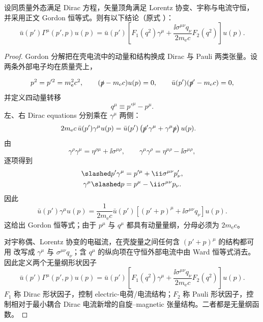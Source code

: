 \begin{proposition}[在壳矢量顶角的独立张量基]
设同质量外态满足 Dirac 方程，矢量顶角满足 Lorentz 协变、宇称与电流守恒，并采用正文 Gordon 恒等式。则有以下结论（原式 ）：
\begin{equation*}
 \boxed{
 \bar u(p')\Gamma^\mu(p',p)u(p)
 =\bar u(p')\left[
 F_1(q^2)\gamma^\mu
 +\frac{\ii\sigma^{\mu\nu}q_\nu}{2m_{\mathrm e} c}F_2(q^2)
 \right]u(p).}
\end{equation*}
\end{proposition}
\begin{proof}
Gordon 分解把在壳电流中的动量和结构换成 Dirac 与 Pauli 两类张量。设两条外部电子均在质量壳上，

\begin{equation*}
 p^2=p'^2=m_{\mathrm e}^2c^2,
 \qquad
 (\slashed p-m_{\mathrm e} c)u(p)=0,
 \qquad
 \bar u(p')(\slashed p'-m_{\mathrm e} c)=0,
\end{equation*}
并定义四动量转移
\begin{equation*}
 q^\mu\equiv p'^\mu-p^\mu.
\end{equation*}
左、右 Dirac equations 分别乘在 $\gamma^\mu$ 两侧：
\begin{align*}
 2m_{\mathrm e} c\,\bar u(p')\gamma^\mu u(p)
 &=\bar u(p')\left(\slashed p'\gamma^\mu+\gamma^\mu\slashed p\right)u(p).
\end{align*}
由
\begin{equation*}
 \gamma^\rho\gamma^\mu
 =\eta^{\rho\mu}+\ii\sigma^{\mu\rho},
 \qquad
 \gamma^\mu\gamma^\rho
 =\eta^{\mu\rho}-\ii\sigma^{\mu\rho},
\end{equation*}
逐项得到
\begin{align*}
 \slashed p'\gamma^\mu
 &=p'^\mu+\ii\sigma^{\mu\nu}p'_\nu,\\
 \gamma^\mu\slashed p
 &=p^\mu-\ii\sigma^{\mu\nu}p_\nu.
\end{align*}
因此
\begin{equation*}
 {
 \bar u(p')\gamma^\mu u(p)
 =\frac1{2m_{\mathrm e} c}\bar u(p')
 \left[(p'+p)^\mu+\ii\sigma^{\mu\nu}q_\nu\right]u(p).}
 \end{equation*}
这给出 Gordon 恒等式；由于 $p^\mu$ 与 $q^\mu$ 都具有动量量纲，分母必须为 $2m_{\mathrm e} c$。

对宇称偶、Lorentz 协变的电磁流，在壳旋量之间任何含 $(p'+p)^\mu$ 的结构都可用  改写成 $\gamma^\mu$ 与 $\sigma^{\mu\nu}q_\nu$；含 $q^\mu$ 的纵向项在守恒外部电流中由 Ward 恒等式消去。因此定义两个无量纲形状因子
\begin{equation*}
 {
 \bar u(p')\Gamma^\mu(p',p)u(p)
 =\bar u(p')\left[
 F_1(q^2)\gamma^\mu
 +\frac{\ii\sigma^{\mu\nu}q_\nu}{2m_{\mathrm e} c}F_2(q^2)
 \right]u(p).}
 \end{equation*}
$F_1$ 称 Dirac 形状因子，控制 electric-电荷/电流结构；$F_2$ 称 Pauli 形状因子，控制相对于最小耦合 Dirac 电流新增的自旋--magnetic 张量结构。二者都是无量纲函数。
\end{proof}

